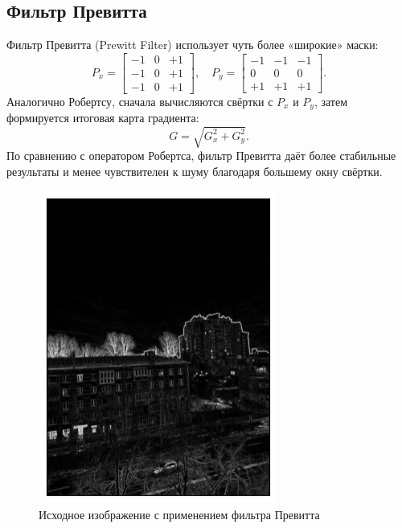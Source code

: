 \documentclass[a4paper,12pt]{article}
\begin{document}
\subsection{Фильтр Превитта}
Фильтр Превитта (Prewitt Filter) использует чуть более «широкие» маски:
\[
P_x = 
\begin{bmatrix}
-1 & 0 & +1 \\
-1 & 0 & +1 \\
-1 & 0 & +1 
\end{bmatrix},
\quad
P_y =
\begin{bmatrix}
-1 & -1 & -1 \\
0 &  0 &  0 \\
+1 & +1 & +1 
\end{bmatrix}.
\]
Аналогично Робертсу, сначала вычисляются свёртки с \(P_x\) и \(P_y\), затем формируется итоговая карта градиента:
\[
G = \sqrt{G_x^2 + G_y^2}.
\]
По сравнению с оператором Робертса, фильтр Превитта даёт более стабильные результаты и менее чувствителен к шуму благодаря большему окну свёртки.
\begin{figure}[H]
    \centering \includegraphics[width=0.7\textwidth]{results/hpf_2.png}
    \caption{Исходное изображение с применением фильтра Превитта}
\end{figure}
\end{document}
